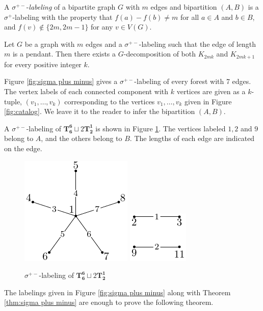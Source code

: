 \documentclass{dmgt}
\begin{document}
\begin{dnt} \label{def:sigma plus minus} 
A $\sigma^{+-}$-\emph{labeling} of a bipartite graph $G$ with $m$ edges and bipartition $(A,B)$ is a $\sigma^+$-labeling with the property that $f(a) - f(b) \neq m$ for all $a \in A$ and $b \in B$, and $f(v) \not\in \{2m,2m-1\}$ for any $v\in V(G)$.
\end{dnt}

\begin{theorem} \label{thm:sigma plus minus} 
Let $G$ be a graph with $m$ edges and a $\sigma^{+-}$-labeling such that the edge of length $m$ is a pendant. Then there exists a $G$-decomposition of both $K_{2mk}$ and $K_{2mk+1}$ for every positive integer $k$.
\end{theorem}

Figure \ref{fig:sigma plus minus} gives a $\sigma^{+-}$-labeling of every forest with 7 edges. The vertex labels of each connected component with $k$ vertices are given as a $k$-tuple, $(v_1,\dots ,v_k)$ corresponding to the vertices $v_1, \dots, v_k$ given in Figure \ref{fig:catalog}. We leave it to the reader to infer the bipartition $(A,B)$. 
\begin{exm}
    A $\sigma^{+-}$-labeling of $\mathbf{T_{6}^{6}}\sqcup 2\mathbf{T_{2}^{1}}$ is shown in Figure \ref{fig:sigma label ex}. The vertices labeled $1,2$ and $9$ belong to $A$, and the others belong to $B$. The lengths of each edge are indicated on the edge.
    \begin{figure}[H]
        \centering
        \includegraphics[scale=1.0]{sigma label ex1.pdf}
         \includegraphics[scale=1.0]{sigma label ex2.pdf}
        \caption{$\sigma^{+-}$-labeling of $\mathbf{T_{6}^{6}}\sqcup 2\mathbf{T_{2}^{1}}$}
        \label{fig:sigma label ex}
    \end{figure}
\end{exm}
 The labelings given in Figure \ref{fig:sigma plus minus} along with Theorem \ref{thm:sigma plus minus} are enough to prove the following theorem. \newpage 
\end{document}
